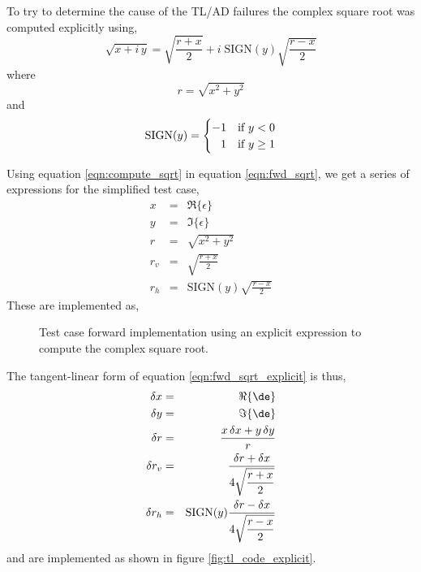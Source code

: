 To try to determine the cause of the TL/AD failures the complex square root was computed explicitly using,
\begin{equation}
  \sqrt{x + i\,y} = \sqrt{\frac{r+x}{2}} + i\;\textrm{SIGN}(y)\sqrt{\frac{r-x}{2}}
  \label{eqn:compute_sqrt}
\end{equation}
where
\begin{equation*}
  r = \sqrt{x^2 + y^2}
\end{equation*}
and
\begin{equation*}
  \textrm{SIGN}(y) = \begin{cases}
                       -1 & \textrm{if } y < 0\\
                       \hfill 1 & \textrm{if } y \ge 1
                     \end{cases}
\end{equation*}

Using equation \ref{eqn:compute_sqrt} in equation \ref{eqn:fwd_sqrt}, we get a series of expressions for the simplified test case,
\begin{eqnarray}
  x &=& \Re\{\epsilon\}\nonumber\\
  y &=& \Im\{\epsilon\}\nonumber\\
  r &=& \sqrt{x^2 + y^2}\label{eqn:fwd_sqrt_explicit}\\
  r_v &=& \sqrt{\frac{r+x}{2}}\nonumber\\
  r_h &=& \textrm{SIGN}(y)\sqrt{\frac{r-x}{2}}\nonumber
\end{eqnarray}
These are implemented as,

\begin{figure}[htp]
  \centering
  \caption{Test case forward implementation using an explicit expression to compute the complex square root.}
  \label{fig:fwd_code_explicit}
\end{figure}

The tangent-linear form of equation \ref{eqn:fwd_sqrt_explicit} is thus,
\begin{eqnarray}
  \delta{x} &=& \Re\{\de\}\nonumber\\
  \delta{y} &=& \Im\{\de\}\nonumber\\
  \delta{r} &=& \frac{x\,\delta{x} + y\,\delta{y}}{r}\label{eqn:tl_sqrt_explicit}\\
  \delta{r_v} &=& \frac{\delta{r} + \delta{x}}{4\sqrt{\displaystyle\frac{r+x}{2}}}\nonumber\\
  \delta{r_h} &=& \textrm{SIGN}(y)\frac{\delta{r} - \delta{x}}{4\sqrt{\displaystyle\frac{r-x}{2}}}\nonumber
\end{eqnarray}
and are implemented as shown in figure \ref{fig:tl_code_explicit}.

